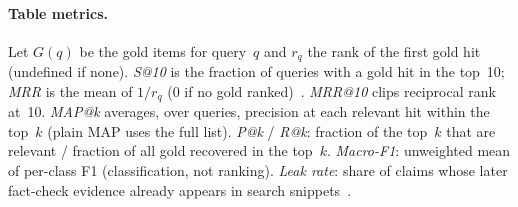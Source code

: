 \documentclass[11pt]{article}
\begin{document}
\paragraph{Table metrics.}
Let $G(q)$ be the gold items for query~$q$ and $r_q$ the rank of the first gold hit (undefined if none).
\emph{S@10} is the fraction of queries with a gold hit in the top~10; \emph{MRR} is the mean of $1/r_q$ ($0$ if no gold ranked)~\cite{pikuliak2023multilingual,peng2025semeval}.
\emph{MRR@10} clips reciprocal rank at~10.
\emph{MAP@k} averages, over queries, precision at each relevant hit within the top~$k$ (plain MAP uses the full list).
\emph{P@k} / \emph{R@k}: fraction of the top~$k$ that are relevant / fraction of all gold recovered in the top~$k$.
\emph{Macro-F1}: unweighted mean of per-class F1 (classification, not ranking).
\emph{Leak rate}: share of claims whose later fact-check evidence already appears in search snippets~\cite{glockner2022missing}.
\end{document}
